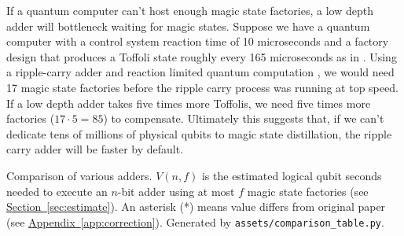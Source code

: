 \documentclass[onecolumn,unpublished]{quantumarticle}
\theoremstyle{definition}
\theoremstyle{definition}
\theoremstyle{definition}
\renewcommand{\sec}[1]{\hyperref[sec:#1]{Section~\ref*{sec:#1}}}
\DeclareRobustCommand{\app}[1]{\hyperref[app:#1]{Appendix~\ref*{app:#1}}}
\begin{document}
If a quantum computer can't host enough magic state factories, a low depth adder will bottleneck waiting for magic states.
Suppose we have a quantum computer with a control system reaction time of 10 microseconds and a factory design that produces a Toffoli state roughly every 165 microseconds as in \cite{gidney2019autoccz}.
Using a ripple-carry adder and reaction limited quantum computation \cite{fowler2012timeoptimal,gidney2019autoccz}, we would need 17 magic state factories before the ripple carry process was running at top speed.
If a low depth adder takes five times more Toffolis, we need five times more factories ($17 \cdot 5 = 85$) to compensate.
Ultimately this suggests that, if we can't dedicate tens of millions of physical qubits to magic state distillation, the ripple carry adder will be faster by default.

\begin{table}
\centering
\resizebox{\linewidth}{!}{

}
    \caption{Comparison of various adders.
    $V(n,f)$ is the estimated logical qubit seconds needed to execute an $n$-bit adder using at most $f$ magic state factories (see \sec{estimate}).
    An asterisk (*) means value differs from original paper (see \app{correction}).
    Generated by \texttt{assets/comparison\_table.py}.
    }
    \label{tbl:comparison}
\end{table}
\end{document}
